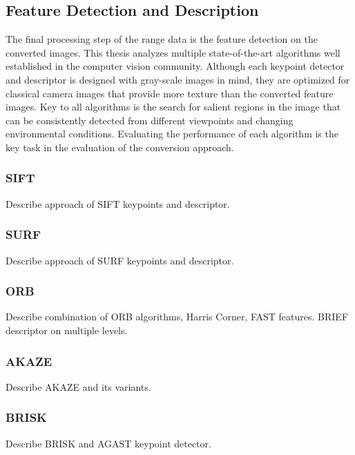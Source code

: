 \subsection{Feature Detection and Description}
\label{sec:feature_algorithms}

The final processing step of the range data is the feature detection on the converted images.
This thesis analyzes multiple state-of-the-art algorithms well established in the computer vision community.
Although each keypoint detector and descriptor is designed with gray-scale images in mind, they are optimized for classical camera images that provide more texture than the converted feature images.
Key to all algorithms is the search for salient regions in the image that can be consistently detected from different viewpoints and changing environmental conditions.
Evaluating the performance of each algorithm is the key task in the evaluation of the conversion approach.

\subsubsection{SIFT}

Describe approach of SIFT keypoints and descriptor.

\subsubsection{SURF}

Describe approach of SURF keypoints and descriptor.

\subsubsection{ORB}

Describe combination of ORB algorithms, Harris Corner, FAST features.
BRIEF descriptor on multiple levels.

\subsubsection{AKAZE}

Describe AKAZE and its variants.

\subsubsection{BRISK}

Describe BRISK and AGAST keypoint detector.
